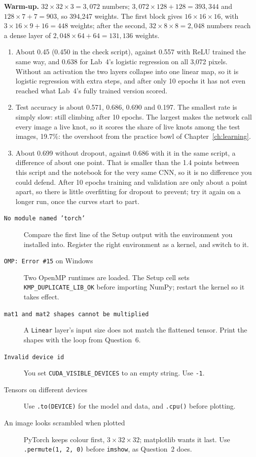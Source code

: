 \begin{expectedfindings}
\textbf{Warm-up.} $32\times32\times3=3{,}072$ numbers; $3{,}072\times128+128=393{,}344$ and $128\times7+7=903$, so 394,247 weights. The first block gives $16\times16\times16$, with $3\times16\times9+16=448$ weights; after the second, $32\times8\times8=2{,}048$ numbers reach a dense layer of $2{,}048\times64+64=131{,}136$ weights.
\begin{enumerate}
  \item About 0.45 (0.450 in the check script), against 0.557 with ReLU trained the same way, and 0.638 for Lab~4's logistic regression on all 3,072 pixels. Without an activation the two layers collapse into one linear map, so it is logistic regression with extra steps, and after only 10 epochs it has not even reached what Lab~4's fully trained version scored.
  \item Test accuracy is about 0.571, 0.686, 0.690 and 0.197. The smallest rate is simply slow: still climbing after 10 epochs. The largest makes the network call every image a live knot, so it scores the share of live knots among the test images, 19.7\%: the overshoot from the practice bowl of Chapter~\ref{ch:learning}.
  \item About 0.699 without dropout, against 0.686 with it in the same script, a difference of about one point. That is smaller than the 1.4 points between this script and the notebook for the very same CNN, so it is no difference you could defend. After 10 epochs training and validation are only about a point apart, so there is little overfitting for dropout to prevent; try it again on a longer run, once the curves start to part.
\end{enumerate}
\end{expectedfindings}

\begin{troubleshoot}
\begin{description}
  \item[\texttt{No module named 'torch'}] Compare the first line of the Setup output with the environment you installed into. Register the right environment as a kernel, and switch to it.
  \item[\texttt{OMP: Error \#15} on Windows] Two OpenMP runtimes are loaded. The Setup cell sets \texttt{KMP\_DUPLICATE\_LIB\_OK} before importing NumPy; restart the kernel so it takes effect.
  \item[\texttt{mat1 and mat2 shapes cannot be multiplied}] A \texttt{Linear} layer's input size does not match the flattened tensor. Print the shapes with the loop from Question~6.
  \item[\texttt{Invalid device id}] You set \texttt{CUDA\_VISIBLE\_DEVICES} to an empty string. Use \texttt{-1}.
  \item[Tensors on different devices] Use \texttt{.to(DEVICE)} for the model and data, and \texttt{.cpu()} before plotting.
  \item[An image looks scrambled when plotted] PyTorch keeps colour first, $3\times32\times32$; matplotlib wants it last. Use \texttt{.permute(1, 2, 0)} before \texttt{imshow}, as Question~2 does.
\end{description}
\end{troubleshoot}

